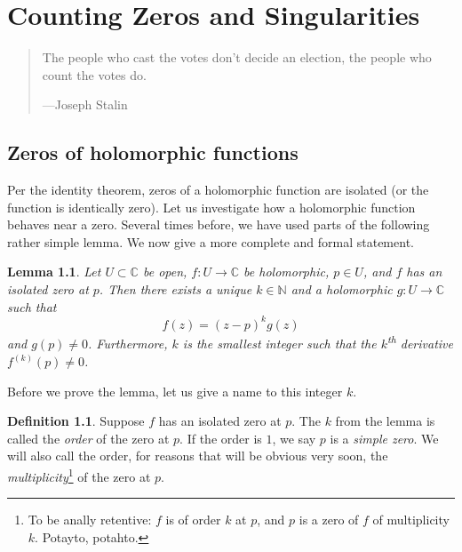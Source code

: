 \documentclass[12pt,openany]{book}
\newcommand{\C}{{\mathbb{C}}}
\newcommand{\N}{{\mathbb{N}}}
\newcommand{\myindex}[1]{#1\index{#1}}
\theoremstyle{plain}
\newtheorem{lemma}[thm]{Lemma}
\theoremstyle{remark}
\theoremstyle{definition}
\newtheorem{defn}[thm]{Definition}
\newenvironment{myepigraph}{%
    \begin{quote}%
    \begingroup\itshape
}{%
    \endgroup%
    \end{quote}
}
\theoremstyle{exercise}
\theoremstyle{example}
\begin{document}

\chapter{Counting Zeros and Singularities} \label{ch:counting}

\begin{myepigraph}
The people who cast the votes don't decide an election, the people who count
the votes do.

---Joseph Stalin
\end{myepigraph}


\section{Zeros of holomorphic functions}

Per the identity theorem, zeros of a holomorphic function are
isolated (or the function is identically zero).  Let us investigate how a
holomorphic function behaves near a zero.
Several times before, we have used parts of the following rather simple
lemma.  We now give a more complete and formal statement.  

\begin{lemma}
Let $U \subset \C$ be open, $f \colon U \to \C$ be holomorphic, $p \in U$,
and $f$ has an isolated zero at $p$.
Then there exists a unique $k \in \N$ and a holomorphic $g \colon U
\to \C$ such that
\begin{equation*}
f(z) = {(z-p)}^k g(z)
\end{equation*}
and $g(p) \not= 0$.
Furthermore, $k$ is the smallest integer such that the $k$\textsuperscript{th}
derivative $f^{(k)}(p) \not= 0$.
\end{lemma}

Before we prove the lemma, let us give a name to this integer $k$.

\begin{defn}
Suppose $f$ has an isolated zero at $p$.
The $k$ from the lemma is called the \emph{order}
of the zero at $p$.
If the order is $1$, we say $p$ is a \emph{\myindex{simple zero}}.
We will also call the order, for reasons that will be obvious very soon,
the \emph{multiplicity}\footnote{%
To be anally retentive: $f$ is of order $k$ at $p$,
and $p$ is a zero of $f$ of multiplicity $k$.  Potayto, potahto.}
of the zero at $p$.
\end{defn}
\end{document}
